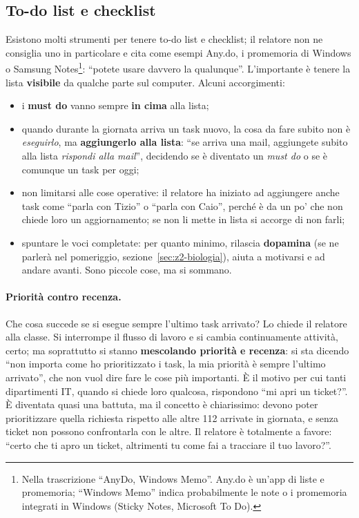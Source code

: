 \subsection{To-do list e checklist}

Esistono molti strumenti per tenere to-do list e checklist; il relatore non ne
consiglia uno in particolare e cita come esempi Any.do, i promemoria di Windows
o Samsung Notes\footnote{Nella trascrizione ``AnyDo, Windows Memo''. Any.do è
un'app di liste e promemoria; ``Windows Memo'' indica probabilmente le note o i
promemoria integrati in Windows (Sticky Notes, Microsoft To Do).}: ``potete usare
davvero la qualunque''. L'importante è tenere la lista \textbf{visibile} da
qualche parte sul computer. Alcuni accorgimenti:
\begin{itemize}
  \item i \textbf{must do} vanno sempre \textbf{in cima} alla lista;
  \item quando durante la giornata arriva un task nuovo, la cosa da fare subito
        non è \emph{eseguirlo}, ma \textbf{aggiungerlo alla lista}: ``se arriva
        una mail, aggiungete subito alla lista \emph{rispondi alla mail}'',
        decidendo se è diventato un \emph{must do} o se è comunque un task per
        oggi;
  \item non limitarsi alle cose operative: il relatore ha iniziato ad
        aggiungere anche task come ``parla con Tizio'' o ``parla con Caio'',
        perché è da un po' che non chiede loro un aggiornamento; se non li
        mette in lista si accorge di non farli;
  \item spuntare le voci completate: per quanto minimo, rilascia
        \textbf{dopamina} (se ne parlerà nel pomeriggio,
        sezione~\ref{sec:z2-biologia}), aiuta a motivarsi e ad andare avanti.
        Sono piccole cose, ma si sommano.
\end{itemize}

\paragraph{Priorità contro recenza.} Che cosa succede se si esegue sempre
l'ultimo task arrivato? Lo chiede il relatore alla classe. Si interrompe il
flusso di lavoro e si cambia continuamente attività, certo; ma soprattutto si
stanno \textbf{mescolando priorità e recenza}: si sta dicendo ``non importa come
ho prioritizzato i task, la mia priorità è sempre l'ultimo arrivato'', che non
vuol dire fare le cose più importanti. È il motivo per cui tanti dipartimenti IT,
quando si chiede loro qualcosa, rispondono ``mi apri un ticket?''. È diventata
quasi una battuta, ma il concetto è chiarissimo: devono poter prioritizzare
quella richiesta rispetto alle altre 112 arrivate in giornata, e senza ticket
non possono confrontarla con le altre. Il relatore è totalmente a favore: ``certo
che ti apro un ticket, altrimenti tu come fai a tracciare il tuo lavoro?''.

